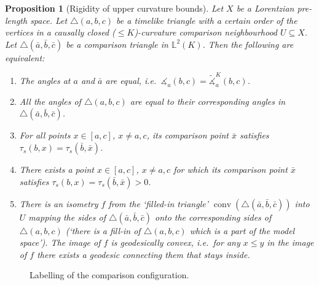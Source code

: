 \documentclass[11pt,reqno]{amsart}
\theoremstyle{definition}
\theoremstyle{definition}
\theoremstyle{plain}
\newtheorem{pop}[dfn]{Proposition}
\theoremstyle{remark}
\newcommand{\LpLSn}{Lorentzian pre-length space}
\newcommand{\ma}{\measuredangle}
\newcommand{\ba}{\bar a}
\newcommand{\bb}{\bar b}
\newcommand{\bc}{\bar c}
\newcommand{\bx}{\bar x}
\DeclareMathOperator{\conv}{conv}
\newcommand{\lm}[1]{\mathbb{L}^2(#1)}
\begin{document}
\begin{pop}[Rigidity of upper curvature bounds]
\label{pop:triangleCBequality}
Let $X$ be a \LpLSn.
Let $\triangle (a,b,c)$ be a timelike triangle with a certain order of the vertices in a causally closed ($\leq K$)-curvature comparison neighbourhood $U \subseteq X$. 
Let $\triangle (\bar a, \bar b, \bar c)$ be a comparison triangle in $\lm{K}$.
Then the following are equivalent:
\begin{enumerate}[label=(\roman*)]
\item The angles at $a$ and $\bar a$ are equal, i.e.\ $\ma_a(b,c) =\widetilde{\ma}_a^K(b,c)$.
\item All the angles of $\triangle (a,b,c)$ are equal to their corresponding angles in $\triangle (\bar a, \bar b, \bar c)$. 
\item For all points $x\in[a,c]$, $x\neq a,c$, its comparison point $\bar x$ satisfies $\tau_s(b,x)=\tau_s(\bar b,\bar x)$.
\item There exists a point $x\in[a,c]$, $x\neq a,c$ for which its comparison point $\bar x$ satisfies $\tau_s(b,x)=\tau_s(\bar b,\bar x)>0$.
\item There is an isometry $f$ from the `filled-in triangle' $\conv(\triangle(\bar a,\bar b,\bar c))$ into $U$ mapping the sides of $\triangle(\bar a,\bar b,\bar c)$ onto the corresponding sides of $\triangle(a,b,c)$ (`there is a fill-in of $\triangle(a,b,c)$ which is a part of the model space'). The image of $f$ is geodesically convex, i.e.\ for any $x\leq y$ in the image of $f$ there exists a geodesic connecting them that stays inside.
\end{enumerate}
\end{pop}

\begin{figure}[h]
\centering
{}
\caption{Labelling of the comparison configuration.}
\label{fig: rigidity notation}
\end{figure}
\end{document}
